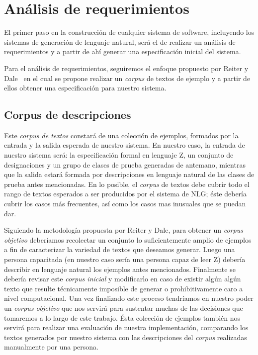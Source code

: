 \chapter{Análisis de requerimientos}
\label{cap:corpus}

El primer paso en la construcción de cualquier sistema de software, incluyendo los sistemas de generación de lenguaje natural, será el de realizar un análisis de requerimientos y a partir de ahí generar una especificación inicial del sistema. 

Para el análisis de requerimientos, seguiremos el enfoque propuesto por Reiter y Dale~\cite{reiter_dale} en el cual se propone realizar un \emph{corpus} de textos de ejemplo y a partir de ellos obtener una especificación para nuestro sistema.  

\section{Corpus de descripciones}                 

Este \emph{corpus de textos} constará de una colección de ejemplos, formados por la entrada y la salida esperada de nuestro sistema. En nuestro caso, la entrada de nuestro sistema será: la especificación formal en lenguaje Z, un conjunto de designaciones y un grupo de clases de prueba generadas de antemano, mientras que la salida estará formada por descripciones en lenguaje natural de las clases de prueba antes mencionadas. En lo posible, el \emph{corpus} de textos debe cubrir todo el rango de textos esperados a ser producidos por el sistema de NLG; éste debería cubrir los casos más frecuentes, así como los casos mas inusuales que se puedan dar.

Siguiendo la metodología propuesta por Reiter y Dale, para obtener un \emph{corpus objetivo} deberíamos recolectar un conjunto lo suficientemente amplio de ejemplos a fin de caracterizar la variedad de textos que deseamos generar. Luego una persona capacitada (en nuestro caso sería una persona capaz de leer Z) debería describir en lenguaje natural los ejemplos antes mencionados. Finalmente se debería revisar este \emph{corpus inicial} y modificarlo en caso de existir algún algún texto que resulte técnicamente imposible de generar o prohibitivamente caro a nivel computacional. Una vez finalizado este proceso tendríamos en nuestro poder un \emph{corpus objetivo} que nos servirá para sustentar muchas de las decisiones que tomaremos a lo largo de este trabajo. Ésta colección de ejemplos también nos servirá para realizar una evaluación de nuestra implementación, comparando los textos generados por nuestro sistema con las descripciones del \emph{corpus} realizadas manualmente por una persona.

